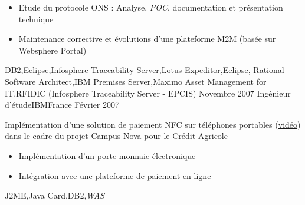\begin{experiences}
{\begin{itemize}
                        \item Etude du protocole ONS : Analyse, \emph{POC}, documentation et présentation technique     
                        \item Maintenance corrective et évolutions d'une plateforme M2M (basée sur Websphere Portal)    
                      \end{itemize}
                    }
                    {
                      DB2,Eclipse,Infosphere Traceability Server,Lotus Expeditor,Eclipse, 
                      Rational Software Architect,IBM Premises Server,Maximo Asset Management for IT,RFIDIC (Infosphere Traceability Server - EPCIS)
                    }
  \emptySeparator
  \experience
  {Novembre 2007}  {Ingénieur d'étude}{IBM}{France}
  {Février 2007}   {
                      Implémentation d'une solution de paiement NFC sur téléphones portables (\href{http://www.nouvo.ch/s-007}{vidéo}) 
                      dans le cadre du projet Campus Nova pour le Crédit Agricole  
                      \begin{itemize}
                        \item Implémentation d'un porte monnaie électronique                                            
                        \item Intégration avec une plateforme de paiement en ligne  
                      \end{itemize}
                  }
                  {J2ME,Java Card,DB2,\emph{WAS}}  
\end{experiences}

